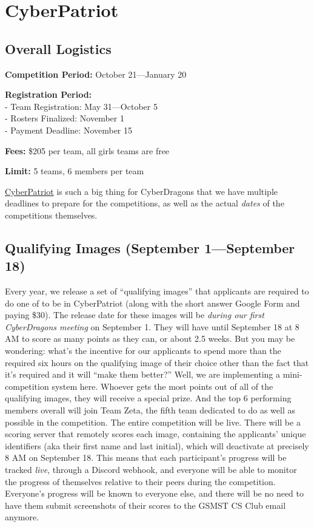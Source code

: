 \documentclass[
  letterpaper,
  DIV=11,
  numbers=noendperiod]{scrartcl}
\begin{document}
\hypertarget{cyberpatriot}{%
\section{CyberPatriot}\label{cyberpatriot}}

\hypertarget{overall-logistics}{%
\subsection{Overall Logistics}\label{overall-logistics}}

\textbf{Competition Period:} October 21---January 20

\textbf{Registration Period:}\\
- Team Registration: May 31---October 5\\
- Rosters Finalized: November 1\\
- Payment Deadline: November 15

\textbf{Fees:} \$205 per team, all girls teams are free

\textbf{Limit:} 5 teams, 6 members per team

\href{https://www.uscyberpatriot.org/}{CyberPatriot} is such a big thing
for CyberDragons that we have multiple deadlines to prepare for the
competitions, as well as the actual \emph{dates} of the competitions
themselves.

\hypertarget{qualifying-images-september-1september-18}{%
\subsection{Qualifying Images (September 1---September
18)}\label{qualifying-images-september-1september-18}}

Every year, we release a set of ``qualifying images'' that applicants
are required to do one of to be in CyberPatriot (along with the short
answer Google Form and paying \$30). The release date for these images
will be \emph{during our first CyberDragons meeting} on September 1.
They will have until September 18 at 8 AM to score as many points as
they can, or about 2.5 weeks. But you may be wondering: what's the
incentive for our applicants to spend more than the required six hours
on the qualifying image of their choice other than the fact that it's
required and it will ``make them better?'' Well, we are implementing a
mini-competition system here. Whoever gets the most points out of all of
the qualifying images, they will receive a special prize. And the top 6
performing members overall will join Team Zeta, the fifth team dedicated
to do as well as possible in the competition. The entire competition
will be live. There will be a scoring server that remotely scores each
image, containing the applicants' unique identifiers (aka their first
name and last initial), which will deactivate at precisely 8 AM on
September 18. This means that each participant's progress will be
tracked \emph{live}, through a Discord webhook, and everyone will be
able to monitor the progress of themselves relative to their peers
during the competition. Everyone's progress will be known to everyone
else, and there will be no need to have them submit screenshots of their
scores to the GSMST CS Club email anymore.
\end{document}
